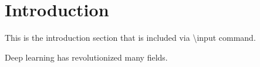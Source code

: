 \section{Introduction}

This is the introduction section that is included via \textbackslash input command.

Deep learning has revolutionized many fields.
